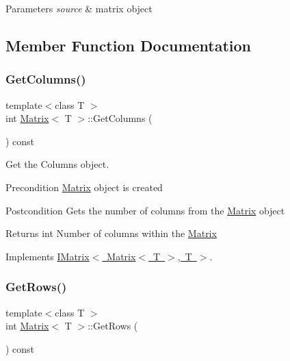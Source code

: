 \begin{DoxyParams}{Parameters}
{\em source} & matrix object \\
\hline
\end{DoxyParams}


\subsection{Member Function Documentation}
\mbox{\label{class_matrix_ada60917bb197292e0645992e108c2c2f}} 
\subsubsection{\texorpdfstring{GetColumns()}{GetColumns()}}
{\footnotesize\ttfamily template$<$class T $>$ \\
int \mbox{\hyperlink{class_matrix}{Matrix}}$<$ T $>$\+::Get\+Columns (\begin{DoxyParamCaption}{ }\end{DoxyParamCaption}) const\hspace{0.3cm}{\ttfamily [virtual]}}



Get the Columns object. 

\begin{DoxyPrecond}{Precondition}
\mbox{\hyperlink{class_matrix}{Matrix}} object is created 
\end{DoxyPrecond}
\begin{DoxyPostcond}{Postcondition}
Gets the number of columns from the \mbox{\hyperlink{class_matrix}{Matrix}} object 
\end{DoxyPostcond}
\begin{DoxyReturn}{Returns}
int Number of columns within the \mbox{\hyperlink{class_matrix}{Matrix}} 
\end{DoxyReturn}


Implements \mbox{\hyperlink{class_i_matrix_a3b84da3898ef38bdf281c13f218fc278}{I\+Matrix$<$ Matrix$<$ T $>$, T $>$}}.

\mbox{\label{class_matrix_aa665db4bc173a7bb4ec3f9da2676dfa6}} 
\subsubsection{\texorpdfstring{GetRows()}{GetRows()}}
{\footnotesize\ttfamily template$<$class T $>$ \\
int \mbox{\hyperlink{class_matrix}{Matrix}}$<$ T $>$\+::Get\+Rows (\begin{DoxyParamCaption}{ }\end{DoxyParamCaption}) const\hspace{0.3cm}{\ttfamily [virtual]}}



